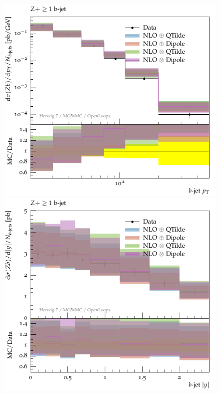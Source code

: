 \documentclass[11pt]{cernrep}
\begin{document}
\begin{figure}[htbp]
\begin{center}
   \includegraphics[scale=0.65]{figs/zbb/herwigzbb/atlas-d03-x01-y01.pdf} 
   \includegraphics[scale=0.65]{figs/zbb/herwigzbb/atlas-d05-x01-y01.pdf} \\

\end{center}
\end{figure}
\end{document}
